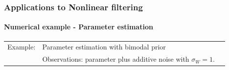 \documentclass[xcolor=dvipsnames, subsection=false]{beamer}
\def\alertb#1{\alert{\color{BrickRed}  #1}}
\def\alertb#1{\alert{\color{BrickRed}  #1}}
\begin{document}
\begin{frame}
\frametitle{Applications to Nonlinear filtering}
\framesubtitle{Numerical example - Parameter estimation}
\begin{minipage}[t][6.5cm][t]{\textwidth}
\begin{tabular}{lll}\alertb{Example:}   & Parameter estimation with bimodal prior 
		\\
		&   Observations:  parameter plus additive noise with $\sigma_W = 1$.
	\end{tabular}

	\centering

\end{minipage}
\end{frame}
\end{document}
